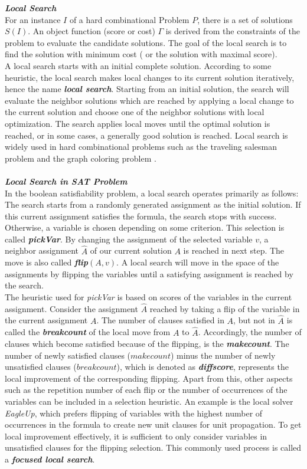 \documentclass[12pt,a4paper,twoside]{scrartcl}
\numberwithin{equation}{section}
\begin{document}
\emph{\textbf{Local Search}}\\
For an instance $I$ of a hard combinational Problem $P$, there is a set of solutions $S(I)$. An object function (score or cost) $\Gamma$ is derived from the constraints of the problem to evaluate the candidate solutions. The goal of the local search is to find the solution with minimum cost ( or the solution with maximal score).\\
A local search starts with an initial complete solution. According to some heuristic, the local search makes local changes to its current solution iteratively, hence the name \emph{\textbf{local search}}. Starting from an initial solution, the search will evaluate the neighbor solutions which are reached by applying a local change to the current solution and choose one of the neighbor solutions with local optimization. The search applies local moves until the optimal solution is reached, or in some cases, a generally good solution is reached.  Local search is widely used in hard combinational problems such as the traveling salesman problem \cite{johnson1990local} and the graph coloring problem \cite{galinier2006survey}. \\
\\
\emph{\textbf{Local Search in SAT Problem}}\\
In the boolean satisfiability problem, a local search operates primarily as follows: The search starts from a randomly generated assignment as the initial solution. If this current assignment satisfies the formula, the search stops with success. Otherwise, a variable is chosen depending on some criterion. This selection is called \emph{\textbf{pickVar}}. By changing the assignment of the selected variable $v$, a neighbor assignment $\hat{A}$ of our current solution $A$ is reached in next step. The move is also called  \emph{\textbf{flip$(A,v)$}}. A local search will move in the space of the assignments by flipping the variables until a satisfying assignment is reached by the search. \\
The heuristic used for \emph{pickVar}  is based on scores of the variables in the current assignment. Consider the assignment $\hat{A}$  reached by taking a flip of the variable in the current assignment $A$. The number of clauses satisfied in $A$, but not in $\hat{A}$ is called the \emph{\textbf{breakcount}} of the local move from $A$ to $\hat{A}$. Accordingly, the number of clauses which become satisfied because of the flipping, is the  \emph{\textbf{makecount}}. The number of newly satisfied clauses ($makecount$) minus the number of newly unsatisfied clauses ($breakcount$), which is denoted as \emph{\textbf{diffscore}}, represents the local improvement of the corresponding flipping. Apart from this, other aspects such as the repetition number of each flip or the number of occurrences of the variables can be included in a selection heuristic. An example is the local solver \emph{EagleUp}, which prefers flipping of variables with the highest number of occurrences in the formula to create new unit clauses for unit propagation. To get local improvement effectively, it is sufficient to only consider variables in unsatisfied clauses for the flipping selection. This commonly used process is called a \emph{\textbf{focused local search}}. \\
\end{document}
